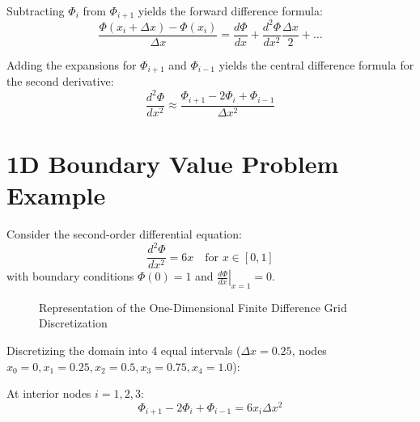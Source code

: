 \documentclass{article}
\begin{document}
Subtracting $\Phi_i$ from $\Phi_{i+1}$ yields the forward difference formula:
\begin{equation}
    \frac{\Phi(x_i + \Delta x) - \Phi(x_i)}{\Delta x} = \frac{d\Phi}{dx} + \frac{d^2\Phi}{dx^2}\frac{\Delta x}{2} + \dots
\end{equation}

Adding the expansions for $\Phi_{i+1}$ and $\Phi_{i-1}$ yields the central difference formula for the second derivative:
\begin{equation}
    \frac{d^2\Phi}{dx^2} \approx \frac{\Phi_{i+1} - 2\Phi_i + \Phi_{i-1}}{\Delta x^2}
\end{equation}

\section{1D Boundary Value Problem Example}

Consider the second-order differential equation:
\begin{equation}
    \frac{d^2\Phi}{dx^2} = 6x \quad \text{for } x \in [0, 1]
\end{equation}
with boundary conditions $\Phi(0) = 1$ and $\left.\frac{d\Phi}{dx}\right|_{x=1} = 0$.

\begin{figure}[H]
    \centering
    \caption{Representation of the One-Dimensional Finite Difference Grid Discretization}
\end{figure}

Discretizing the domain into 4 equal intervals ($\Delta x = 0.25$, nodes $x_0=0, x_1=0.25, x_2=0.5, x_3=0.75, x_4=1.0$):

At interior nodes $i = 1, 2, 3$:
\begin{equation}
    \Phi_{i+1} - 2\Phi_i + \Phi_{i-1} = 6 x_i \Delta x^2
\end{equation}
\end{document}
